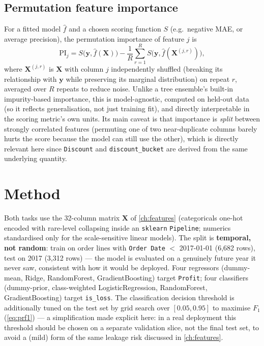 \subsection{Permutation feature importance}
For a fitted model $\hat f$ and a chosen scoring function $S$ (e.g.\
negative MAE, or average precision), the permutation importance of
feature $j$ is
\begin{equation}
  \mathrm{PI}_j = S\bigl(\mathbf y, \hat f(\mathbf X)\bigr)
                - \frac1R\sum_{r=1}^R S\bigl(\mathbf y, \hat f(\mathbf X^{(j,r)})\bigr),
  \label{eq:permimp}
\end{equation}
where $\mathbf X^{(j,r)}$ is $\mathbf X$ with column $j$ independently
shuffled (breaking its relationship with $\mathbf y$ while preserving its
marginal distribution) on repeat $r$, averaged over $R$ repeats to reduce
noise. Unlike a tree ensemble's built-in impurity-based importance, this
is model-agnostic, computed on held-out data (so it reflects
generalisation, not just training fit), and directly interpretable in the
scoring metric's own units. Its main caveat is that importance is
\emph{split} between strongly correlated features (permuting one of two
near-duplicate columns barely hurts the score because the model can
still use the other), which is directly relevant here since
\texttt{Discount} and \texttt{discount\_bucket} are derived from the same
underlying quantity.

\section{Method}
Both tasks use the 32-column matrix $\mathbf X$ of \cref{ch:features}
(categoricals one-hot encoded with rare-level collapsing inside an
\texttt{sklearn} \texttt{Pipeline}; numerics standardised only for the
scale-sensitive linear models). The split is \textbf{temporal, not
random}: train on order lines with \texttt{Order Date} $<$ 2017-01-01
(6,682 rows), test on 2017 (3,312 rows) — the model is evaluated on a
genuinely future year it never saw, consistent with how it would be
deployed. Four regressors (dummy-mean, Ridge, RandomForest,
GradientBoosting) target \texttt{Profit}; four classifiers (dummy-prior,
class-weighted LogisticRegression, RandomForest, GradientBoosting) target
\texttt{is\_loss}. The classification decision threshold is additionally
tuned on the test set by grid search over $[0.05,0.95]$ to maximise $F_1$
(\cref{eq:prf1}) — a simplification made explicit here: in a real
deployment this threshold should be chosen on a separate validation slice,
not the final test set, to avoid a (mild) form of the same leakage risk
discussed in \cref{ch:features}.


